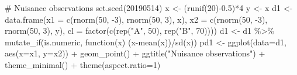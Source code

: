 \documentclass[
  letterpaper,
]{krantz}
\newenvironment{Shaded}{\begin{snugshade}}{\end{snugshade}}
\newcommand{\AttributeTok}[1]{\textcolor[rgb]{0.40,0.45,0.13}{#1}}
\newcommand{\CommentTok}[1]{\textcolor[rgb]{0.37,0.37,0.37}{#1}}
\newcommand{\ControlFlowTok}[1]{\textcolor[rgb]{0.00,0.23,0.31}{#1}}
\newcommand{\DecValTok}[1]{\textcolor[rgb]{0.68,0.00,0.00}{#1}}
\newcommand{\FloatTok}[1]{\textcolor[rgb]{0.68,0.00,0.00}{#1}}
\newcommand{\FunctionTok}[1]{\textcolor[rgb]{0.28,0.35,0.67}{#1}}
\newcommand{\NormalTok}[1]{\textcolor[rgb]{0.00,0.23,0.31}{#1}}
\newcommand{\OtherTok}[1]{\textcolor[rgb]{0.00,0.23,0.31}{#1}}
\newcommand{\SpecialCharTok}[1]{\textcolor[rgb]{0.37,0.37,0.37}{#1}}
\newcommand{\StringTok}[1]{\textcolor[rgb]{0.13,0.47,0.30}{#1}}
\begin{document}
\begin{Shaded}
\begin{Highlighting}[]
\CommentTok{\# Nuisance observations}
\FunctionTok{set.seed}\NormalTok{(}\DecValTok{20190514}\NormalTok{)}
\NormalTok{x }\OtherTok{\textless{}{-}}\NormalTok{ (}\FunctionTok{runif}\NormalTok{(}\DecValTok{20}\NormalTok{)}\SpecialCharTok{{-}}\FloatTok{0.5}\NormalTok{)}\SpecialCharTok{*}\DecValTok{4}
\NormalTok{y }\OtherTok{\textless{}{-}}\NormalTok{ x}
\NormalTok{d1 }\OtherTok{\textless{}{-}} \FunctionTok{data.frame}\NormalTok{(}\AttributeTok{x1 =} \FunctionTok{c}\NormalTok{(}\FunctionTok{rnorm}\NormalTok{(}\DecValTok{50}\NormalTok{, }\SpecialCharTok{{-}}\DecValTok{3}\NormalTok{), }
                            \FunctionTok{rnorm}\NormalTok{(}\DecValTok{50}\NormalTok{, }\DecValTok{3}\NormalTok{), x),}
                 \AttributeTok{x2 =} \FunctionTok{c}\NormalTok{(}\FunctionTok{rnorm}\NormalTok{(}\DecValTok{50}\NormalTok{, }\SpecialCharTok{{-}}\DecValTok{3}\NormalTok{), }
                            \FunctionTok{rnorm}\NormalTok{(}\DecValTok{50}\NormalTok{, }\DecValTok{3}\NormalTok{), y),}
                 \AttributeTok{cl =} \FunctionTok{factor}\NormalTok{(}\FunctionTok{c}\NormalTok{(}\FunctionTok{rep}\NormalTok{(}\StringTok{"A"}\NormalTok{, }\DecValTok{50}\NormalTok{), }
                             \FunctionTok{rep}\NormalTok{(}\StringTok{"B"}\NormalTok{, }\DecValTok{70}\NormalTok{))))}
\NormalTok{d1 }\OtherTok{\textless{}{-}}\NormalTok{ d1 }\SpecialCharTok{\%\textgreater{}\%} 
  \FunctionTok{mutate\_if}\NormalTok{(is.numeric, }\ControlFlowTok{function}\NormalTok{(x) (x}\SpecialCharTok{{-}}\FunctionTok{mean}\NormalTok{(x))}\SpecialCharTok{/}\FunctionTok{sd}\NormalTok{(x))}
\NormalTok{pd1 }\OtherTok{\textless{}{-}} \FunctionTok{ggplot}\NormalTok{(}\AttributeTok{data=}\NormalTok{d1, }\FunctionTok{aes}\NormalTok{(}\AttributeTok{x=}\NormalTok{x1, }\AttributeTok{y=}\NormalTok{x2)) }\SpecialCharTok{+} 
  \FunctionTok{geom\_point}\NormalTok{() }\SpecialCharTok{+}
    \FunctionTok{ggtitle}\NormalTok{(}\StringTok{"Nuisance observations"}\NormalTok{) }\SpecialCharTok{+} 
  \FunctionTok{theme\_minimal}\NormalTok{() }\SpecialCharTok{+}
    \FunctionTok{theme}\NormalTok{(}\AttributeTok{aspect.ratio=}\DecValTok{1}\NormalTok{) }


\end{Highlighting}
\end{Shaded}
\end{document}
